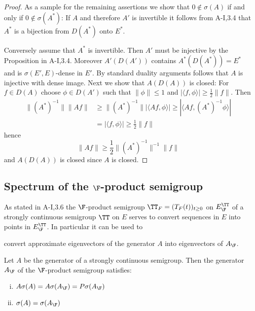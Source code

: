 \begin{proof}
As a sample for the remaining assertions we show that $0 \notin \sigma(A)$ if and only if $0 \notin \sigma(A^*)$:
If $A$ and therefore $A'$ is invertible it follows from A-I,3.4 that $A^*$ is a bijection from $D(A^*)$ onto $E^*$.

Conversely assume that $A^*$ is invertible.
Then $A'$ must be injective by the Proposition in A-I,3.4.
Moreover $A'(D(A'))$ contains $A^*(D(A^*)) = E^*$ and is $\sigma(E',E)$-dense in $E'$.
By standard duality arguments follows that $A$ is injective with dense image.
Next we show that $A(D(A))$ is closed: For $f \in D(A)$ choose $\phi \in D(A')$ such that $\|\phi\| \leq 1$ and $|\langle f,\phi \rangle| \geq \frac{1}{2}\|f\|$.
Then
\begin{align*}
\|(A^*)^{-1}\| \|Af\| &\geq \|(A^*)^{-1}\| |\langle Af,\phi \rangle| \geq |\langle Af,(A^*)^{-1}\phi \rangle| \\
&= |\langle f,\phi \rangle| \geq \frac{1}{2}\|f\|
\end{align*}
hence
\[
\|Af\| \geq \frac{1}{2}\|(A^*)^{-1}\|^{-1}\|f\|
\]
and $A(D(A))$ is closed since $A$ is closed.
\end{proof}

\subsection{Spectrum of the $\F$-product semigroup}\label{subsec:a3-4.5}

As stated in A-I,3.6 the $\F$-product semigroup $\TT_{F} = (T_{F}(t))_{t \geq 0}$ on $E_{\F}^{\TT}$ of a strongly continuous semigroup $\TT$ on $E$ serves to convert sequences in $E$ into points in $E_{\F}^{\TT}$.
In particular it can be used to



\newpage
convert approximate eigenvectors of the generator $A$ into eigenvectors of $A_{\F}$.

\begin{proposition}\label{prop:a3-4.6}

Let $A$ be the generator of a strongly continuous semigroup. Then the generator $A_{\F}$ of the $\F$-product semigroup satisfies:
\begin{enumerate}[(i)]
\item $A\sigma(A) = A\sigma(A_{\F}) = P\sigma(A_{\F})$

\item $\sigma(A) = \sigma(A_{\F})$
\end{enumerate}
\end{proposition}

